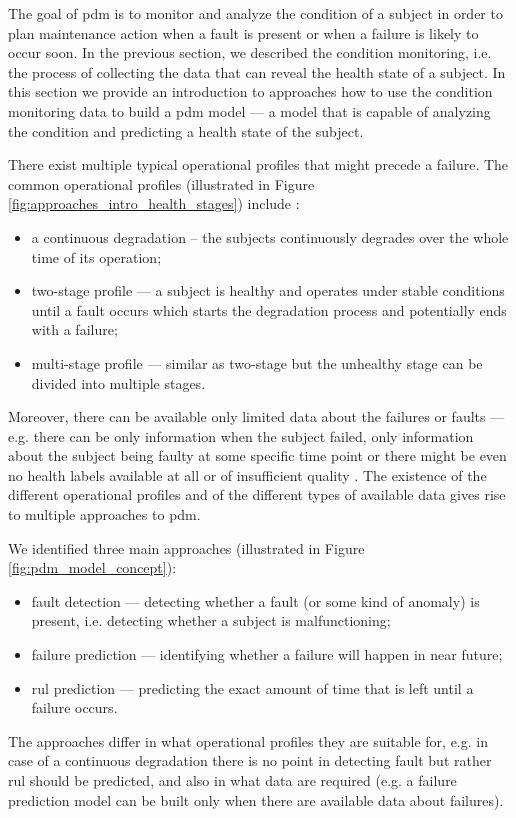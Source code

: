 The goal of \acrshort{pdm} is to monitor and analyze the condition of a subject in order to plan maintenance action when a fault is present or when a failure is likely to occur soon.
In the previous section, we described the condition monitoring, i.e. the process of collecting the data that can reveal the health state of a subject.
In this section we provide an introduction to approaches how to use the condition monitoring data to build a \acrshort{pdm} model --- a model that is capable of analyzing the condition and predicting a health state of the subject.

There exist multiple typical operational profiles that might precede a failure.
The common operational profiles (illustrated in Figure \ref{fig:approaches_intro_health_stages}) include \cite{lei2018machinery}:
\begin{itemize}
    \item a continuous degradation -- the subjects continuously degrades over the whole time of its operation;
    \item two-stage profile --- a subject is healthy and operates under stable conditions until a fault occurs which starts the degradation process and potentially ends with a failure;
    \item multi-stage profile --- similar as two-stage but the unhealthy stage can be divided into multiple stages.
\end{itemize}
Moreover, there can be available only limited data about the failures or faults --- e.g. there can be only information when the subject failed, only information about the subject being faulty at some specific time point \cite{westernbearing, data_set_aps_scania} or there might be even no health labels available at all or of insufficient quality \cite{yuan2019}.
The existence of the different operational profiles and of the different types of available data gives rise to multiple approaches to \acrshort{pdm}.

We identified three main approaches (illustrated in Figure \ref{fig:pdm_model_concept}):
\begin{itemize}
    \item fault detection --- detecting whether a fault (or some kind of anomaly) is present, i.e. detecting whether a subject is malfunctioning;
    \item failure prediction --- identifying whether a failure will happen in near future;
    \item \gls{rul} prediction --- predicting the exact amount of time that is left until a failure occurs.
\end{itemize}
The approaches differ in what operational profiles they are suitable for, e.g. in case of a continuous degradation there is no point in detecting fault but rather \gls{rul} should be predicted, and also in what data are required (e.g. a failure prediction model can be built only when there are available data about failures).

